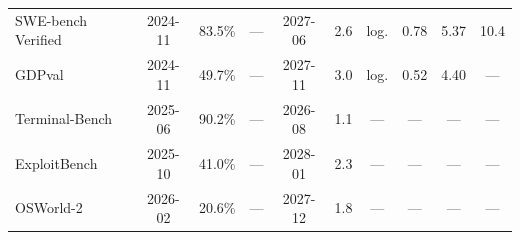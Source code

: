 \begin{table}[t]
{\begin{tabular}{lccccccccc}
SWE-bench Verified  & 2024-11 & 83.5\% & ---     & 2027-06 & 2.6 & log. & 0.78 & 5.37 & 10.4 \\
GDPval              & 2024-11 & 49.7\% & ---     & 2027-11 & 3.0 & log. & 0.52 & 4.40 & ---  \\
Terminal-Bench      & 2025-06 & 90.2\% & ---     & 2026-08 & 1.1 & ---  & ---  & ---  & ---  \\
ExploitBench        & 2025-10 & 41.0\% & ---     & 2028-01 & 2.3 & ---  & ---  & ---  & ---  \\
OSWorld-2           & 2026-02 & 20.6\% & ---     & 2027-12 & 1.8 & ---  & ---  & ---  & ---  \\
\bottomrule
\end{tabular}%
}
\end{table}
